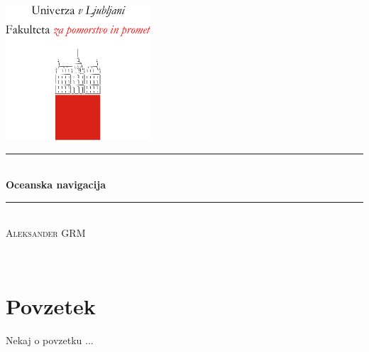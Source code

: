 \documentclass[11pt,twosided]{book}
\numberwithin{nalogactr}{chapter}
\numberwithin{primerctr}{chapter}
\begin{document}
\pagestyle{empty}

    \begin{center}
	    \includegraphics[height=5cm]{logo/fpp_logo_vertical_slo_red.pdf}\\[3cm]
	    
		\rule{\linewidth}{1 mm} \\[7mm]
		{ \huge \bfseries Oceanska navigacija}\\[4mm]
		\rule{\linewidth}{1 mm} \\[3cm]
		
		{\large \textsc{Aleksander GRM} }
		
	\end{center}

\clearpage
~
\newpage
\pagestyle{plain}
\setcounter{page}{1}

\tableofcontents

\newpage
\chapter*{Povzetek}

Nekaj o povzetku ...
\clearpage
~
\newpage
\pagestyle{fancy}
\setcounter{page}{1}



\newpage


\newpage


\newpage


\newpage



\newpage



\end{document}
